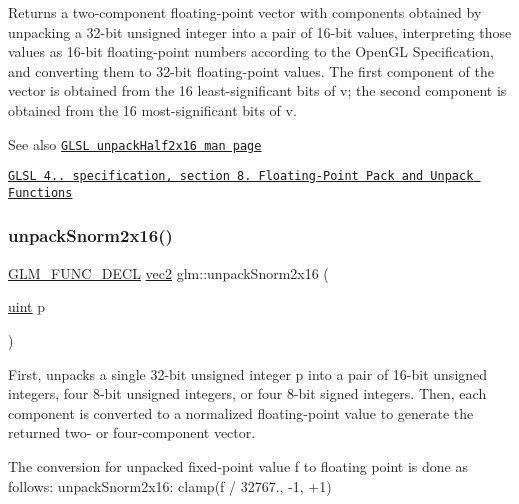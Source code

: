Returns a two-\/component floating-\/point vector with components obtained by unpacking a 32-\/bit unsigned integer into a pair of 16-\/bit values, interpreting those values as 16-\/bit floating-\/point numbers according to the Open\+GL Specification, and converting them to 32-\/bit floating-\/point values. The first component of the vector is obtained from the 16 least-\/significant bits of v; the second component is obtained from the 16 most-\/significant bits of v.

\begin{DoxySeeAlso}{See also}
\href{http://www.opengl.org/sdk/docs/manglsl/xhtml/unpackHalf2x16.xml}{\tt G\+L\+SL unpack\+Half2x16 man page} 

\href{http://www.opengl.org/registry/doc/GLSLangSpec.4.20.8.pdf}{\tt G\+L\+SL 4.. specification, section 8. Floating-\/\+Point Pack and Unpack Functions} 
\end{DoxySeeAlso}
\mbox{\label{group__core__func__packing_gacd8f8971a3fe28418be0d0fa1f786b38}} 
\subsubsection{\texorpdfstring{unpack\+Snorm2x16()}{unpackSnorm2x16()}}
{\footnotesize\ttfamily \hyperlink{setup_8hpp_ab2d052de21a70539923e9bcbf6e83a51}{G\+L\+M\+\_\+\+F\+U\+N\+C\+\_\+\+D\+E\+CL} \hyperlink{group__core__types_gaa1618f51db67eaa145db101d8c8431d8}{vec2} glm\+::unpack\+Snorm2x16 (\begin{DoxyParamCaption}\item[{\hyperlink{group__core__precision_ga4fd29415871152bfb5abd588334147c8}{uint}}]{p }\end{DoxyParamCaption})}

First, unpacks a single 32-\/bit unsigned integer p into a pair of 16-\/bit unsigned integers, four 8-\/bit unsigned integers, or four 8-\/bit signed integers. Then, each component is converted to a normalized floating-\/point value to generate the returned two-\/ or four-\/component vector.

The conversion for unpacked fixed-\/point value f to floating point is done as follows\+: unpack\+Snorm2x16\+: clamp(f / 32767., -\/1, +1)

